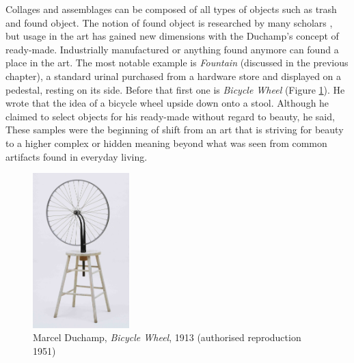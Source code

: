 Collages and assemblages can be composed of all types of objects such as trash and found object. The notion of found object is researched by many scholars \cite{camic2010trashed, gascoyne1935short}, but usage in the art has gained new dimensions with the Duchamp's concept of ready-made. Industrially manufactured or anything found  anymore can found a place in the art. The most notable example is \textit{Fountain} (discussed in the previous chapter), a standard urinal purchased from a hardware store and displayed on a pedestal, resting on its side. Before that first one is \textit{Bicycle Wheel} (Figure \ref{fig:Duchamp_BicycleWheel}). He wrote that the idea of a bicycle wheel upside down onto a stool. Although he claimed to select objects for his ready-made without regard to beauty, he said,  These samples were the beginning of 
shift from an art that is striving for beauty to a higher complex or hidden meaning beyond what was seen from common artifacts found in everyday living.

\begin{figure}[h!]
  \centering
  \includegraphics[height=6cm]{graphics/duchamp-bicycle-wheel-1913.jpg}
  \caption{Marcel Duchamp, \textit{Bicycle Wheel}, 1913 (authorised reproduction 1951)}
  \label{fig:Duchamp_BicycleWheel}
\end{figure}

